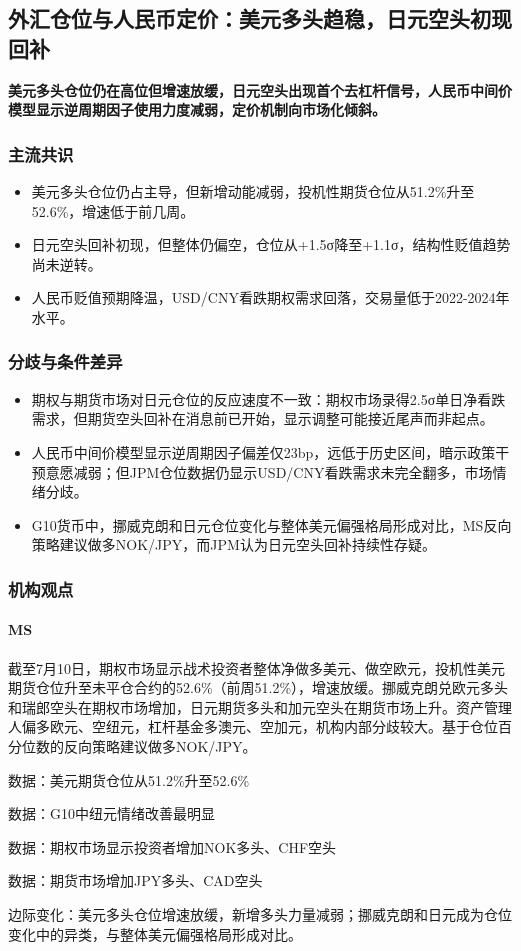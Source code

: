\documentclass[11pt]{ctexart}
\begin{document}
\subsection{外汇仓位与人民币定价：美元多头趋稳，日元空头初现回补}
\textbf{美元多头仓位仍在高位但增速放缓，日元空头出现首个去杠杆信号，人民币中间价模型显示逆周期因子使用力度减弱，定价机制向市场化倾斜。}
\subsubsection*{主流共识}
\begin{itemize}
  \item 美元多头仓位仍占主导，但新增动能减弱，投机性期货仓位从51.2\%升至52.6\%，增速低于前几周。
  \item 日元空头回补初现，但整体仍偏空，仓位从+1.5σ降至+1.1σ，结构性贬值趋势尚未逆转。
  \item 人民币贬值预期降温，USD/CNY看跌期权需求回落，交易量低于2022-2024年水平。
\end{itemize}
\subsubsection*{分歧与条件差异}
\begin{itemize}
  \item 期权与期货市场对日元仓位的反应速度不一致：期权市场录得2.5σ单日净看跌需求，但期货空头回补在消息前已开始，显示调整可能接近尾声而非起点。
  \item 人民币中间价模型显示逆周期因子偏差仅23bp，远低于历史区间，暗示政策干预意愿减弱；但JPM仓位数据仍显示USD/CNY看跌需求未完全翻多，市场情绪分歧。
  \item G10货币中，挪威克朗和日元仓位变化与整体美元偏强格局形成对比，MS反向策略建议做多NOK/JPY，而JPM认为日元空头回补持续性存疑。
\end{itemize}
\subsubsection*{机构观点}
\paragraph{MS} 截至7月10日，期权市场显示战术投资者整体净做多美元、做空欧元，投机性美元期货仓位升至未平仓合约的52.6\%（前周51.2\%），增速放缓。挪威克朗兑欧元多头和瑞郎空头在期权市场增加，日元期货多头和加元空头在期货市场上升。资产管理人偏多欧元、空纽元，杠杆基金多澳元、空加元，机构内部分歧较大。基于仓位百分位数的反向策略建议做多NOK/JPY。
{\small\color{refgray}数据：美元期货仓位从51.2\%升至52.6\%\par}
{\small\color{refgray}数据：G10中纽元情绪改善最明显\par}
{\small\color{refgray}数据：期权市场显示投资者增加NOK多头、CHF空头\par}
{\small\color{refgray}数据：期货市场增加JPY多头、CAD空头\par}
{\small\color{refgray}边际变化：美元多头仓位增速放缓，新增多头力量减弱；挪威克朗和日元成为仓位变化中的异类，与整体美元偏强格局形成对比。\par}
\end{document}
